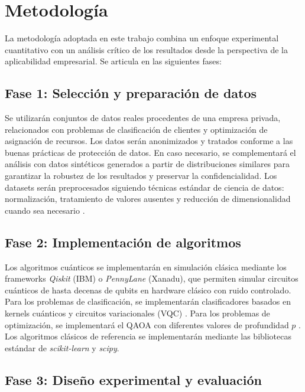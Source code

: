 \chapter{Metodología}

La metodología adoptada en este trabajo combina un enfoque experimental cuantitativo con un análisis crítico de los resultados desde la perspectiva de la aplicabilidad empresarial. Se articula en las siguientes fases:

\section{Fase 1: Selección y preparación de datos}

Se utilizarán conjuntos de datos reales procedentes de una empresa privada, relacionados con problemas de clasificación de clientes y optimización de asignación de recursos. Los datos serán anonimizados y tratados conforme a las buenas prácticas de protección de datos. En caso necesario, se complementará el análisis con datos sintéticos generados a partir de distribuciones similares para garantizar la robustez de los resultados y preservar la confidencialidad. Los datasets serán preprocesados siguiendo técnicas estándar de ciencia de datos: normalización, tratamiento de valores ausentes y reducción de dimensionalidad cuando sea necesario \citep{jordan2015}.

\section{Fase 2: Implementación de algoritmos}

Los algoritmos cuánticos se implementarán en simulación clásica mediante los frameworks \textit{Qiskit} (IBM) o \textit{PennyLane} (Xanadu), que permiten simular circuitos cuánticos de hasta decenas de qubits en hardware clásico con ruido controlado. Para los problemas de clasificación, se implementarán clasificadores basados en kernels cuánticos \citep{schuld2021} y circuitos variacionales (VQC) \citep{cerezo2021}. Para los problemas de optimización, se implementará el QAOA con diferentes valores de profundidad $p$ \citep{farhi2014, zhou2020}. Los algoritmos clásicos de referencia se implementarán mediante las bibliotecas estándar de \textit{scikit-learn} y \textit{scipy}.

\section{Fase 3: Diseño experimental y evaluación}

